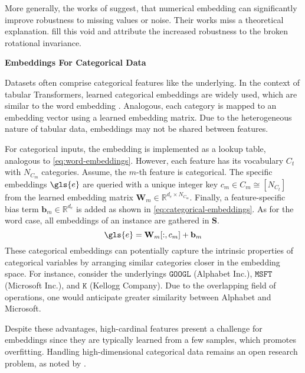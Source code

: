 More generally, the works of \textcites[][24997]{gorishniyEmbeddingsNumericalFeatures2022}[][3--4]{somepalliSaintImprovedNeural2021} suggest, that numerical embedding can significantly improve robustness to missing values or noise. Their works miss a theoretical explanation. \textcite[][513--514]{grinsztajnWhyTreebasedModels2022} fill this void and attribute the increased robustness to the broken rotational invariance.

\textbf{Embeddings For Categorical Data}

Datasets often comprise categorical features like the underlying. In the context of tabular Transformers, learned categorical embeddings are widely used, which are similar to the word embedding
\autocites[][18935]{gorishniyRevisitingDeepLearning2021}[][2--3]{huangTabTransformerTabularData2020}[][4]{somepalliSaintImprovedNeural2021}. Analogous, each category is mapped to an embedding vector using a learned embedding matrix. Due to the heterogeneous nature of tabular data, embeddings may not be shared between features.

For categorical inputs, the embedding is implemented as a lookup table, analogous to \cref{eq:word-embeddings}. However, each feature has
its vocabulary $C_t$ with $N_{C_m}$ categories. Assume, the $m$-th feature is categorical. The specific embeddings $\gls{e}$ are queried with a unique integer key $c_{m} \in C_m \cong\left[N_{C_t}\right]$ from the learned embedding matrix $\mathbf{W}_m \in \mathbb{R}^{d_e \times N_{C_m}}$. Finally, a feature-specific bias term $\mathbf{b}_m \in \mathbb{R}^{d_{e}}$ is added as shown in \cref{eq:categorical-embeddings}. As for the word case, all embeddings of an instance are gathered in $\mathbf{S}$.
\begin{equation}
    \gls{e}=\mathbf{W}_m[:,c_{m}] +\mathbf{b}_m
    \label{eq:categorical-embeddings}
\end{equation}
These categorical embeddings can potentially capture the intrinsic properties of categorical variables by arranging similar categories closer in the embedding space. For instance, consider the underlyings $\mathtt{GOOGL}$ (Alphabet Inc.), $\mathtt{MSFT}$ (Microsoft Inc.), and $\mathtt{K}$ (Kellogg Company). Due to the overlapping field of operations, one would anticipate greater similarity between Alphabet and Microsoft.

Despite these advantages, high-cardinal features present a challenge for embeddings since they are typically learned from a few samples, which promotes \gls{overfitting}. Handling high-dimensional categorical data remains an open research problem, as noted by \textcite[][12]{borisovDeepNeuralNetworks2022}.

